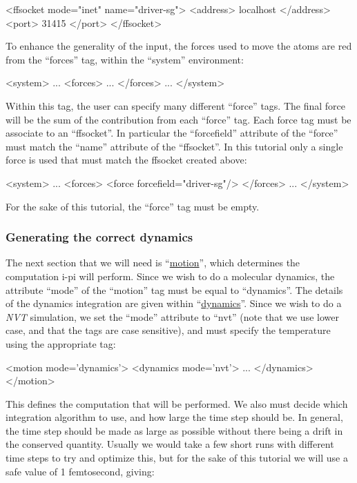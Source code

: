\documentclass[11pt,english,fleqn]{report}
\newenvironment{code}{%
\footnotesize
\verbatim
}{
\endverbatim
\normalsize
}
\begin{document}
\begin{code}
<ffsocket mode="inet" name="driver-sg">
   <address> localhost </address>
   <port> 31415 </port>
</ffsocket>
\end{code}

To enhance the generality of the input, the forces used to move the
atoms are red from the ``forces'' tag, within the ``system'' environment:

\begin{code}
<system>
   ...
   <forces>
      ...
   </forces>
   ...
</system>
\end{code}

Within this tag, the user can specify many different ``force''
tags. The final force will be the sum of the contribution from each
``force'' tag. Each force tag must be associate to an
``ffsocket''. In particular the ``forcefield'' attribute of the
``force'' must match the ``name'' attribute of the ``ffsocket''. In
this tutorial only a single force is used that must match the ffsocket
created above:

\begin{code}
<system>
   ...
   <forces>
      <force forcefield="driver-sg"/>
   </forces>
   ...
</system>
\end{code}

For the sake of this tutorial, the ``force'' tag must be empty.

\subsubsection{Generating the correct dynamics}

The next section that we will need is
{}``\hyperref[MOTION]{motion}'', which determines the computation i-pi
will perform. Since we wish to do a molecular dynamics, the attribute
``mode'' of the ``motion'' tag must be equal to ``dynamics''.
The details of the dynamics integration are given within
{}``\hyperref[DYNAMICS]{dynamics}''.  Since we wish to
do a \emph{NVT} simulation, we set the {}``mode'' attribute to {}``nvt''
(note that we use lower case, and that the tags are case sensitive),
and must specify the temperature using the appropriate tag:

\begin{code}
<motion mode='dynamics'>
   <dynamics mode='nvt'>
      ...
   </dynamics>
</motion>
\end{code}

This defines the computation that will be performed. We also must decide
which integration algorithm to use, and how large the time step should
be. In general, the time step should be made as large as possible
without there being a drift in the conserved quantity. Usually we
would take a few short runs with different time steps to try and optimize
this, but for the sake of this tutorial we will use a safe value of
1 femtosecond, giving:
\end{document}
